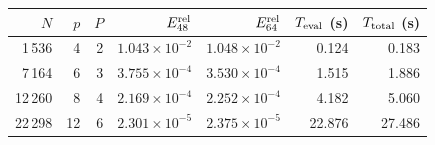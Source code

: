 \begin{tabular}{@{}rrrrrrr@{}}
\toprule
$N$ & $p$ & $P$ & $E_{48}^{\rm rel}$ & $E_{64}^{\rm rel}$ & $T_{\rm eval}$ (s) & $T_{\rm total}$ (s)\\
\midrule
1\,536 & 4 & 2 & $1.043\times10^{-2}$ & $1.048\times10^{-2}$ & 0.124 & 0.183\\
7\,164 & 6 & 3 & $3.755\times10^{-4}$ & $3.530\times10^{-4}$ & 1.515 & 1.886\\
12\,260 & 8 & 4 & $2.169\times10^{-4}$ & $2.252\times10^{-4}$ & 4.182 & 5.060\\
22\,298 & 12 & 6 & $2.301\times10^{-5}$ & $2.375\times10^{-5}$ & 22.876 & 27.486\\
\bottomrule
\end{tabular}
